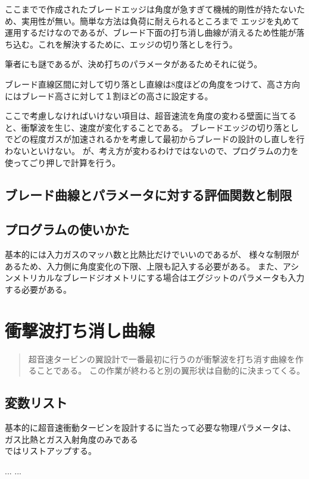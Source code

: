 \documentclass[a4j,10pt,oneside,openany]{jsbook}
\begin{document}
ここまでで作成されたブレードエッジは角度が急すぎて機械的剛性が持たないため、実用性が無い。簡単な方法は負荷に耐えられるところまで
エッジを丸めて運用するだけなのであるが、ブレード下面の打ち消し曲線が消えるため性能が落ち込む。これを解決するために、エッジの切り落としを行う。

筆者にも謎であるが、決め打ちのパラメータがあるためそれに従う。

ブレード直線区間に対して切り落とし直線は8度ほどの角度をつけて、高さ方向にはブレード高さに対して１割ほどの高さに設定する。

ここで考慮しなければいけない項目は、超音速流を角度の変わる壁面に当てると、衝撃波を生じ、速度が変化することである。
ブレードエッジの切り落としでどの程度ガスが加速されるかを考慮して最初からブレードの設計のし直しを行わないといけない。
が、考え方が変わるわけではないので、プログラムの力を使ってごり押しで計算を行う。

\section{ブレード曲線とパラメータに対する評価関数と制限}

\section{プログラムの使いかた}

基本的には入力ガスのマッハ数と比熱比だけでいいのであるが、
様々な制限があるため、入力側に角度変化の下限、上限も記入する必要がある。
また、アシンメトリカルなブレードジオメトリにする場合はエグジットのパラメータも入力する必要がある。

\chapter{衝撃波打ち消し曲線}
\begin{abstract}
超音速タービンの翼設計で一番最初に行うのが衝撃波を打ち消す曲線を作ることである。
この作業が終わると別の翼形状は自動的に決まってくる。
\end{abstract}

\section{変数リスト}
基本的に超音速衝動タービンを設計するに当たって必要な物理パラメータは、
ガス比熱とガス入射角度のみである\\

ではリストアップする。

\begin{thebibliography}{20}
...
...
\end{thebibliography}

\newpage
\printindex
%
%
\end{document}
